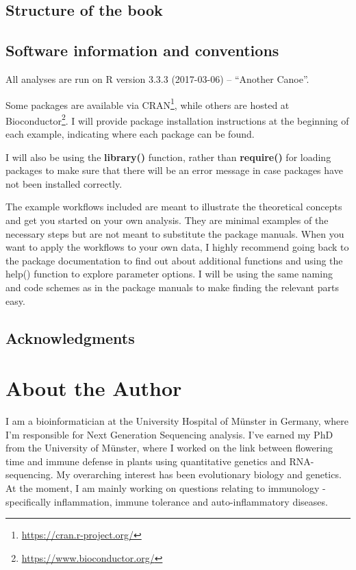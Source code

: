 \documentclass[12pt,]{krantz}
\renewcommand{\href}[2]{#2\footnote{\url{#1}}}
\begin{document}
\section*{Structure of the book}\label{structure-of-the-book}


\section*{Software information and
conventions}\label{software-information-and-conventions}


All analyses are run on R version 3.3.3 (2017-03-06) -- ``Another
Canoe''.

Some packages are available via
\href{https://cran.r-project.org/}{CRAN}, while others are hosted at
\href{https://www.bioconductor.org/}{Bioconductor}. I will provide
package installation instructions at the beginning of each example,
indicating where each package can be found.

I will also be using the \textbf{library()} function, rather than
\textbf{require()} for loading packages to make sure that there will be
an error message in case packages have not been installed correctly.

The example workflows included are meant to illustrate the theoretical
concepts and get you started on your own analysis. They are minimal
examples of the necessary steps but are not meant to substitute the
package manuals. When you want to apply the workflows to your own data,
I highly recommend going back to the package documentation to find out
about additional functions and using the help() function to explore
parameter options. I will be using the same naming and code schemes as
in the package manuals to make finding the relevant parts easy.

\section*{Acknowledgments}\label{acknowledgments}


\chapter*{About the Author}\label{about-the-author}


I am a bioinformatician at the University Hospital of Münster in
Germany, where I'm responsible for Next Generation Sequencing analysis.
I've earned my PhD from the University of Münster, where I worked on the
link between flowering time and immune defense in plants using
quantitative genetics and RNA-sequencing. My overarching interest has
been evolutionary biology and genetics. At the moment, I am mainly
working on questions relating to immunology - specifically inflammation,
immune tolerance and auto-inflammatory diseases.
\end{document}
